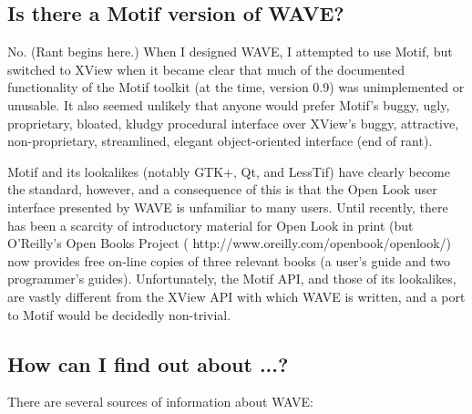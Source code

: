 \documentclass[twoside]{book}
\newcommand{\WAVE}{{\sf WAVE}\xspace}
\begin{document}
\subsection{Is there a Motif version of \WAVE{}?}

No.  (Rant begins here.)  When I designed \WAVE{}, I attempted to use
Motif, but switched to XView when it became clear that much of the
documented functionality of the Motif toolkit (at the time, version
0.9) was unimplemented or unusable.  It also seemed unlikely that
anyone would prefer Motif's buggy, ugly, proprietary, bloated, kludgy
procedural interface over XView's buggy, attractive, non-proprietary,
streamlined, elegant object-oriented interface (end of rant).

Motif and its lookalikes (notably GTK+, Qt, and LessTif) have clearly become
the standard, however, and a consequence of this is that the Open Look user
interface presented by \WAVE{} is unfamiliar to many users.  Until recently,
there has been a scarcity of introductory material for Open Look in
print (but O'Reilly's Open Books Project
(
{http://www.oreilly.com/openbook/openlook/}) now provides free
on-line copies of three relevant books (a user's guide and two
programmer's guides).  Unfortunately, the
Motif API, and those of its lookalikes, are vastly different from the XView API
with which \WAVE{} is written, and a port to Motif would be decidedly
non-trivial.

\subsection{How can I find out about ...?}

There are several sources of information about \WAVE{}:
\end{document}
